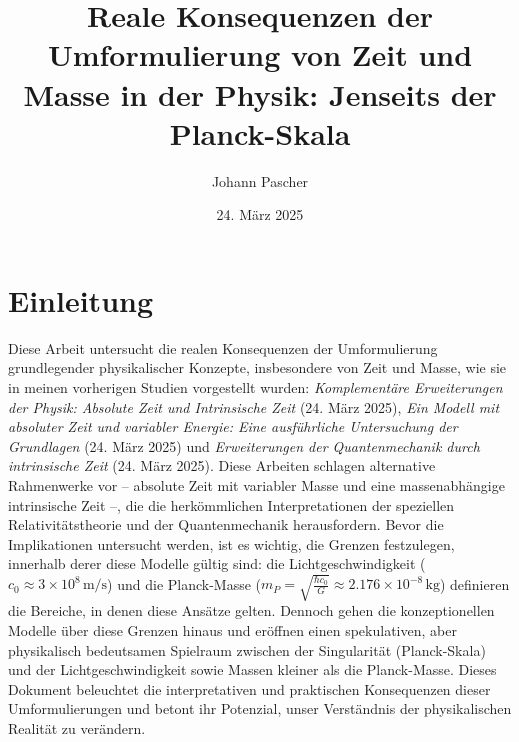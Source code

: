 \documentclass[a4paper,12pt]{article}
\begin{document}
	
	\title{Reale Konsequenzen der Umformulierung von Zeit und Masse in der Physik: Jenseits der Planck-Skala}
	\author{Johann Pascher}
	\date{24. März 2025}
	\maketitle
	
	\tableofcontents %
	\newpage %
	
	\section{Einleitung}
	Diese Arbeit untersucht die realen Konsequenzen der Umformulierung grundlegender physikalischer Konzepte, insbesondere von Zeit und Masse, wie sie in meinen vorherigen Studien vorgestellt wurden: \textit{Komplementäre Erweiterungen der Physik: Absolute Zeit und Intrinsische Zeit} (24. März 2025), \textit{Ein Modell mit absoluter Zeit und variabler Energie: Eine ausführliche Untersuchung der Grundlagen} (24. März 2025) und \textit{Erweiterungen der Quantenmechanik durch intrinsische Zeit} (24. März 2025). Diese Arbeiten schlagen alternative Rahmenwerke vor – absolute Zeit mit variabler Masse und eine massenabhängige intrinsische Zeit –, die die herkömmlichen Interpretationen der speziellen Relativitätstheorie und der Quantenmechanik herausfordern. Bevor die Implikationen untersucht werden, ist es wichtig, die Grenzen festzulegen, innerhalb derer diese Modelle gültig sind: die Lichtgeschwindigkeit (\( c_0 \approx 3 \times 10^8 \, \text{m/s} \)) und die Planck-Masse (\( m_P = \sqrt{\frac{\hbar c_0}{G}} \approx 2.176 \times 10^{-8} \, \text{kg} \)) definieren die Bereiche, in denen diese Ansätze gelten. Dennoch gehen die konzeptionellen Modelle über diese Grenzen hinaus und eröffnen einen spekulativen, aber physikalisch bedeutsamen Spielraum zwischen der Singularität (Planck-Skala) und der Lichtgeschwindigkeit sowie Massen kleiner als die Planck-Masse. Dieses Dokument beleuchtet die interpretativen und praktischen Konsequenzen dieser Umformulierungen und betont ihr Potenzial, unser Verständnis der physikalischen Realität zu verändern.
	
\end{document}
